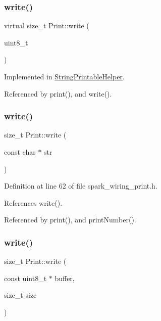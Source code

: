 \subsubsection{\texorpdfstring{write()}{write()}\hspace{0.1cm}{\footnotesize\ttfamily [1/6]}}
{\footnotesize\ttfamily virtual size\+\_\+t Print\+::write (\begin{DoxyParamCaption}\item[{uint8\+\_\+t}]{ }\end{DoxyParamCaption})\hspace{0.3cm}{\ttfamily [pure virtual]}}



Implemented in \hyperlink{class_string_printable_helper_adc5aab11289f917cefa1225b59afde2a}{String\+Printable\+Helper}.



Referenced by print(), and write().

\mbox{\label{class_print_a5b40e0e9cab1f2fe5bb0cb22ffe5adda}} 
\subsubsection{\texorpdfstring{write()}{write()}\hspace{0.1cm}{\footnotesize\ttfamily [2/6]}}
{\footnotesize\ttfamily size\+\_\+t Print\+::write (\begin{DoxyParamCaption}\item[{const char $\ast$}]{str }\end{DoxyParamCaption})\hspace{0.3cm}{\ttfamily [inline]}}



Definition at line 62 of file spark\+\_\+wiring\+\_\+print.\+h.



References write().



Referenced by print(), and print\+Number().

\mbox{\label{class_print_ad98d820df11e2697be1e4b1ea30b4a23}} 
\subsubsection{\texorpdfstring{write()}{write()}\hspace{0.1cm}{\footnotesize\ttfamily [3/6]}}
{\footnotesize\ttfamily size\+\_\+t Print\+::write (\begin{DoxyParamCaption}\item[{const uint8\+\_\+t $\ast$}]{buffer,  }\item[{size\+\_\+t}]{size }\end{DoxyParamCaption})\hspace{0.3cm}{\ttfamily [virtual]}}



